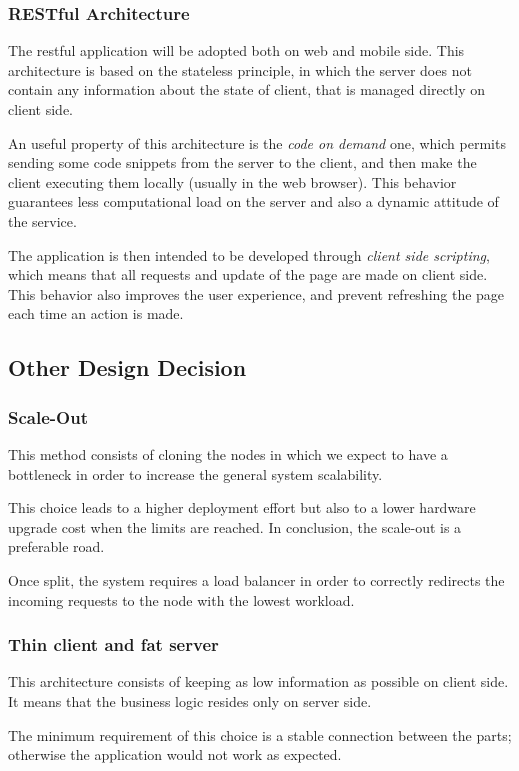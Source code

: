 \documentclass[table, 12pt]{article}
\begin{document}
\subsubsection{RESTful Architecture}
The restful application will be adopted both on web and mobile side. This architecture is based on the stateless principle, in which the server does not contain any information about the state of client, that is managed directly on client side.

An useful property of this architecture is the \textit{code on demand} one, which permits sending some code snippets from the server to the client, and then make the client executing them locally (usually in the web browser). This behavior guarantees less computational load on the server and also a dynamic attitude of the service.

The application is then intended to be developed through \textit{client side scripting}, which means that all requests and update of the page are made on client side. This behavior also improves the user experience, and prevent refreshing the page each time an action is made.

\subsection{Other Design Decision}
\subsubsection{Scale-Out}
This method consists of cloning the nodes in which we expect to have a bottleneck in order to increase the general system scalability.

This choice leads to a higher deployment effort but also to a lower hardware upgrade cost when the limits are reached. In conclusion, the scale-out is a preferable road.

Once split, the system requires a load balancer in order to correctly redirects the incoming requests to the node with the lowest workload.

\subsubsection{Thin client and fat server}
This architecture consists of keeping as low information as possible on client side. It means that the business logic resides only on server side.

The minimum requirement of this choice is a stable connection between the parts; otherwise the application would not work as expected.
\end{document}
